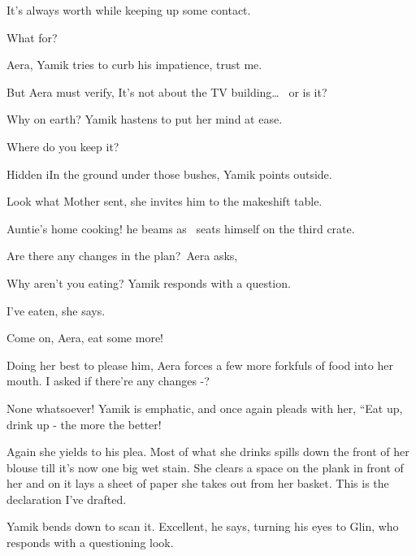 \documentclass[letterpaper]{article}
\begin{document}
{\textquotedbl}It's always worth while keeping up some contact.{\textquotedbl} 

{\textquotedbl}What for?{\textquotedbl} 

{\textquotedbl}Aera,{\textquotedbl} Yamik tries to curb his impatience, {\textquotedbl}trust me.{\textquotedbl} 

But Aera must verify, {\textquotedbl}It's not about the TV building{\dots} \ or is it?{\textquotedbl} 

{\textquotedbl}Why on earth?{\textquotedbl} Yamik hastens to put her mind at ease. ~

{\textquotedbl}Where do you keep it?{\textquotedbl} 

{\textquotedbl}Hidden iIn the ground under those bushes,{\textquotedbl} Yamik points outside.

{\textquotedbl}Look what Mother sent,{\textquotedbl} she invites him to the makeshift table. 

{\textquotedbl}Auntie's home cooking!{\textquotedbl} he beams as \ seats himself on the third crate. 

{\textquotedbl}Are there any changes in the plan?{\textquotedbl}~Aera asks,

{\textquotedbl}Why aren't you eating?{\textquotedbl} Yamik responds with a question. 

{\textquotedbl}I've eaten,{\textquotedbl} she says. ~

{\textquotedbl}Come on, Aera, eat some more!{\textquotedbl} \ 

Doing her best to please him, Aera forces a few more forkfuls of food into her mouth. {\textquotedbl}I asked if there're
any changes -?{\textquotedbl}

{\textquotedbl}None whatsoever!{\textquotedbl} Yamik is emphatic, and once again pleads with her, ``Eat up, drink up
-{ }the more the better!{\textquotedbl} 

Again she yields to his plea. Most of what she drinks spills down the front of her blouse till it's now one big wet
stain. She clears a space on the plank in front of her and on it lays a sheet of paper she takes out from her basket.
{\textquotedbl}This is the declaration I've drafted.{\textquotedbl}

Yamik bends down to scan it. {\textquotedbl}Excellent,{\textquotedbl} he says, turning his eyes to Glin, who responds
with a questioning look. 
\end{document}
